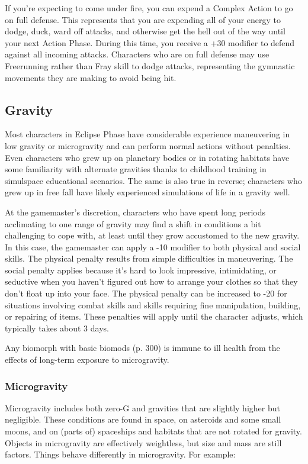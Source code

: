 If you’re expecting to come under fire, you can expend a Complex Action to go on full defense. This represents that you are expending all of your energy to dodge, duck, ward off attacks, and otherwise get the hell out of the way until your next Action Phase. During this time, you receive a +30 modifier to defend against all incoming attacks. Characters who are on full defense may use Freerunning rather than Fray skill to dodge attacks, representing the gymnastic movements they are making to avoid being hit. 

\subsection{Gravity} \label{sec:gravity} 

Most characters in Eclipse Phase have considerable experience maneuvering in low gravity or microgravity and can perform normal actions without penalties. Even characters who grew up on planetary bodies or in rotating habitats have some familiarity with alternate gravities thanks to childhood training in simulspace educational scenarios. The same is also true in reverse; characters who grew up in free fall have likely experienced simulations of life in a gravity well. 

At the gamemaster’s discretion, characters who have spent long periods acclimating to one range of gravity may find a shift in conditions a bit challenging to cope with, at least until they grow accustomed to the new gravity. In this case, the gamemaster can apply a -10 modifier to both physical and social skills. The physical penalty results from simple difficulties in maneuvering. The social penalty applies because it’s hard to look impressive, intimidating, or seductive when you haven’t figured out how to arrange your clothes so that they don’t float up into your face. The physical penalty can be increased to -20 for situations involving combat skills and skills requiring fine manipulation, building, or repairing of items. These penalties will apply until the character adjusts, which typically takes about 3 days. 

Any biomorph with basic biomods (p. 300) is immune to ill health from the effects of long-term exposure to microgravity. 

\subsubsection{Microgravity} 

Microgravity includes both zero-G and gravities that are slightly higher but negligible. These conditions are found in space, on asteroids and some small moons, and on (parts of) spaceships and habitats that are not rotated for gravity. Objects in microgravity are effectively weightless, but size and mass are still factors. Things behave differently in microgravity. For example: 

